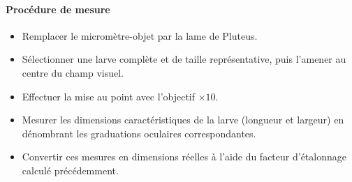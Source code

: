\paragraph{Procédure de mesure} 
\begin{itemize}
    \item Remplacer le micromètre-objet par la lame de Pluteus.
    \item Sélectionner une larve complète et de taille représentative, puis l'amener au centre du champ visuel.
    \item Effectuer la mise au point avec l'objectif $\times 10$.
    \item Mesurer les dimensions caractéristiques de la larve (longueur et largeur) en dénombrant les graduations oculaires correspondantes.
    \item Convertir ces mesures en dimensions réelles à l'aide du facteur d'étalonnage calculé précédemment.
\end{itemize}


